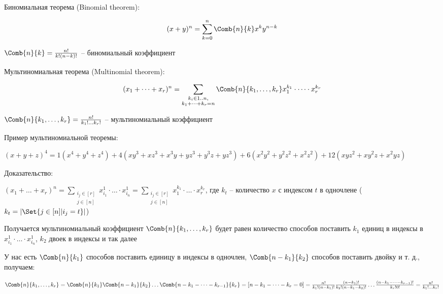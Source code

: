 \documentclass[12pt]{article}
\begin{document}
    \begin{MyTheorem}
        \Ths Биномиальная теорема (Binomial theorem):

        \[(x + y)^n = \sum_{k=0}^n \Comb{n}{k} x^k y^{n - k}\]
    \end{MyTheorem}

    $\Comb{n}{k} = \frac{n!}{k!(n - k)!}$ -- биномиальный коэффициент

    \begin{MyTheorem}
        \Ths Мультиномиальная теорема (Multinomial theorem):

        \[(x_1 + \dots + x_r)^n = \sum_{\substack{k_i \in 1..n, \\ k_1 + \dots + k_r = n}} \Comb{n}{k_1, \dots, k_r} x^{k_1}_1 \cdot \dots \cdot x^{k_r}_r\]
    \end{MyTheorem}

    $\Comb{n}{k_1, \dots, k_r} = \frac{n!}{k_1! \dots k_r!}$ -- мультиномиальный коэффициент


    \Ex Пример мультиномиальной теоремы:

    $(x + y + z)^4 = 1 (x^4 + y^4 + z^4) + 4 (xy^3 + xz^3 + x^3y + yz^3 + y^3z + yz^3) +
    6(x^2y^2 + y^2z^2 + x^2z^2) + 12 (xyz^2 + xy^2z + x^2yz)$

    Доказательство:

    \begin{MyProof}
        $(x_1 + \dots + x_r)^n = \sum_{\substack{i_j \in [r] \\ j \in [n]}} x_{i_1}^1 \cdot \dots \cdot x_{i_n}^1 =
        \sum_{\substack{i_j \in [r] \\ j \in [n]}} x_1^{k_1} \cdot \dots \cdot x_r^{k_r}$, где $k_t$ -- количество $x$ с индексом $t$ в одночлене ($k_t = |\Set{j \in [n] | i_j = t}|$)

        Получается мультиномиальный коэффициент $\Comb{n}{k_1, \dots, k_r}$
        будет равен количество способов поставить $k_1$ единиц в индексы в $x_{i_1}^1 \cdot \dots \cdot x_{i_n}^1$, $k_2$ двоек в индексы и так далее

        У нас есть $\Comb{n}{k_1}$ способов поставить единицу в индексы в одночлен,
        $\Comb{n - k_1}{k_2}$ способов поставить двойку и т. д., получаем:

        $\Comb{n}{k_1, \dots, k_r} = \Comb{n}{k_1} \Comb{n - k_1}{k_2} \dots \Comb{n - k_1 - \dots - k_{r - 1}}{k_r} = [n - k_1 - \dots - k_r = 0] = \\
        \frac{n!}{k_1! (n - k_1)!} \frac{(n - k_1)!}{k_2! (n - k_1 - k_2)!} \dots \frac{(n - k_1 - \dots - k_{r - 1})!}{k_r! 0!} = \frac{n!}{k_1! \dots k_r!}$

    \end{MyProof}
\end{document}
